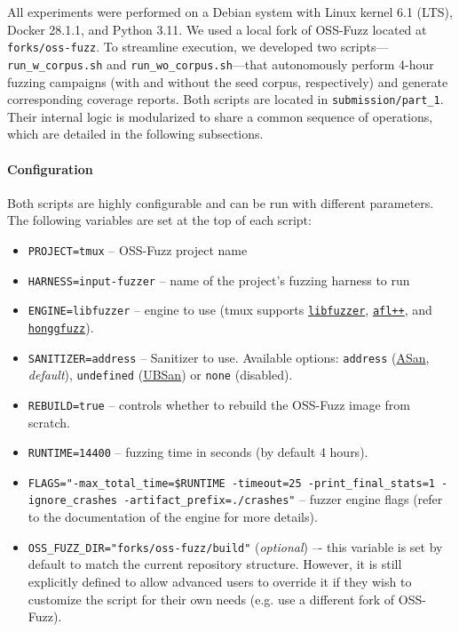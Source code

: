 All experiments were performed on a Debian system with Linux kernel 6.1 (LTS),
Docker 28.1.1, and Python 3.11. We used a local fork of OSS-Fuzz located at
\texttt{forks/oss-fuzz}. To streamline execution, we developed two
scripts---\texttt{run\_w\_corpus.sh} and \texttt{run\_wo\_corpus.sh}---that
autonomously perform 4-hour fuzzing campaigns (with and without the seed corpus,
respectively) and generate corresponding coverage reports. Both scripts are
located in \texttt{submission/part\_1}. Their internal logic is modularized to
share a common sequence of operations, which are detailed in the following
subsections.

\noindent \paragraph{Configuration} \label{sec:methodology_configuration} Both scripts are highly configurable and can be run with different parameters. The following variables are set at the top of each script:
\begin{itemize}
	\item \texttt{PROJECT=tmux} -- OSS-Fuzz project name
	\item \texttt{HARNESS=input-fuzzer} -- name of the project's fuzzing harness to run
	\item \texttt{ENGINE=libfuzzer} -- engine to use (tmux supports
	      \href{https://llvm.org/docs/LibFuzzer.html}{\texttt{libfuzzer}},
	      \href{https://aflplus.plus/}{\texttt{afl++}}, and
	      \href{https://honggfuzz.dev/}{\texttt{honggfuzz}}).
	      \cite{oss-fuzz:tmux_project_yaml}
	\item \texttt{SANITIZER=address} -- Sanitizer to use. Available options:
	      \texttt{address} (\href{https://clang.llvm.org/docs/AddressSanitizer.html}{ASan}, \emph{default}),
	      \texttt{undefined} (\href{https://clang.llvm.org/docs/UndefinedBehaviorSanitizer.html}{UBSan}) or
	      \texttt{none} (disabled).
	      \cite{oss-fuzz:tmux_project_yaml}
	\item \texttt{REBUILD=true} -- controls whether to rebuild the OSS-Fuzz image from scratch.
	\item \texttt{RUNTIME=14400} -- fuzzing time in seconds (by default 4 hours).
	\item \texttt{FLAGS="-max\_total\_time=\$RUNTIME -timeout=25 -print\_final\_stats=1 -ignore\_crashes -artifact\_prefix=./crashes"} -- fuzzer engine flags (refer to the documentation of the engine for more details).
	\item \texttt{OSS\_FUZZ\_DIR="forks/oss-fuzz/build"} (\emph{optional}) –- this variable is set by default to match the current repository structure. However, it is still explicitly defined to allow advanced users to override it if they wish to customize the script for their own needs (e.g. use a different fork of OSS-Fuzz).
\end{itemize}

